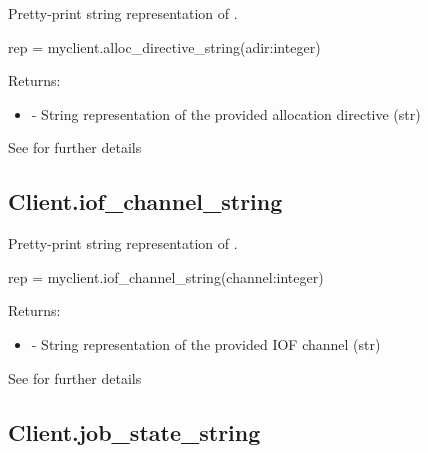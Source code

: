 \summary

Pretty-print string representation of .

\format

\pyspecificstart
\begin{codepar}
rep = myclient.alloc_directive_string(adir:integer)
\end{codepar}
\pyspecificend

\begin{arglist}
\end{arglist}

Returns:
\begin{itemize}
    \item {} - String representation of the provided allocation directive (str)
\end{itemize}

See  for further details


\subsection{Client.iof_channel_string}

\summary

Pretty-print string representation of .

\format

\pyspecificstart
\begin{codepar}
rep = myclient.iof_channel_string(channel:integer)
\end{codepar}
\pyspecificend

\begin{arglist}
\end{arglist}

Returns:
\begin{itemize}
    \item {} - String representation of the provided IOF channel (str)
\end{itemize}

See  for further details


\subsection{Client.job_state_string}

